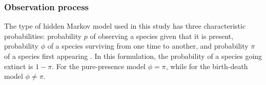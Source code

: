 \documentclass[12pt,letterpaper]{article}
\begin{document}



\subsubsection*{Observation process}
The type of hidden Markov model used in this study has three characteristic probabilities: probability \(p\) of observing a species given that it is present, probability \(\phi\) of a species surviving from one time to another, and probability \(\pi\) of a species first appearing \citep{Royle2008}. In this formulation, the probability of a species going extinct is \(1 - \pi\). For the pure-presence model \(\phi = \pi\), while for the birth-death model \(\phi \neq \pi\).
\end{document}
